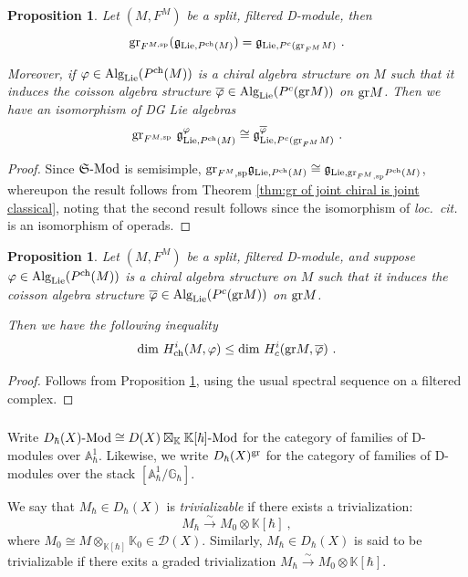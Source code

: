 \documentclass[11pt]{amsart}
\numberwithin{equation}{section}
\newtheorem{prop}[theo]{Proposition}
\theoremstyle{definition}
\newcommand{\bb}{\mathbb}
\newcommand{\mf}{\mathfrak}
\newcommand{\spe}{{\textup{sp}}}
\newcommand{\gd}{{\textup{gr}}}
\newcommand{\D}{{\mathcal{D}}}
\newcommand{\Mod}{{\textup{-Mod}}}
\newcommand{\ik}{{\bb K}}
\newcommand{\Alg}{{\textup{Alg}}}
\newcommand{\Lie}{{\textup{Lie}}}
\newcommand{\ch}{{\textup{ch}}}
\newcommand{\Ss}{{{\mf{S}}}}
\newcommand{\0}{{\textbf{0}}}
\newcommand{\gr}{\textup{gr}}
\def\IA{\mathbb{A}}
\def\IG{\mathbb{G}}
\def\dim{{\rm dim}}
\def\ch{{\rm ch}}
\def\gf{\mathfrak{g}}
\def \mf{\mathfrak}
\begin{document}
\begin{prop}\label{prop:filt on Lie alg}
	Let $(M, F^M)$ be a split, filtered D-module, then 
	\[
	\gr_{F^{M,\spe}}(\gf_{\Lie,P^\ch(M)}) = \gf_{\Lie, P^c(\gr_{F^M} M)}~.
	\]

	Moreover, if $\varphi\in \Alg_\Lie(P^\ch(M))$ is a chiral algebra structure on $M$ such that it induces the coisson algebra structure $\overline \varphi \in \Alg_{\Lie}(P^c(\gr M))$ on $\gr M$. Then we have an isomorphism of DG Lie algebras
	\[
	\gr_{F^{M,\spe}}\ \gf^\varphi_{\Lie,P^\ch(M)} \cong \gf^{\overline{\varphi}}_{\Lie,P^c(\gr_{F^M} M)}~.
	\]
\end{prop}
\begin{proof}
Since $\Ss\Mod$ is semisimple, $\gr_{F^M,\spe}\gf_{\Lie,P^\ch(M)} \cong \gf_{\Lie, \gr_{F^M, \spe} P^\ch(M)}$, whereupon the result follows from Theorem \ref{thm:gr of joint chiral is joint classical}, noting that the second result follows since the isomorphism of \textit{loc.\ cit.} is an isomorphism of operads.
\end{proof}


\begin{prop}\label{prop:bound on cohomology}
Let $(M, F^M)$ be a split, filtered D-module, and suppose $\varphi\in \Alg_\Lie(P^\ch(M))$ is a chiral algebra structure on $M$ such that it induces the coisson algebra structure $\overline \varphi \in \Alg_{\Lie}(P^c(\gr M))$ on $\gr M$.

Then we have the following inequality
\[
\dim\ H^i_\ch(M,\varphi) \le \dim\ H^i_c(\gr M, \overline \varphi)~.
\]
\end{prop}
\begin{proof}
Follows from Proposition \ref{prop:filt on Lie alg}, using the usual spectral sequence on a filtered complex.
\end{proof}



\subsubsection{}

Write $D_\hbar(X)\Mod\cong D(X)\boxtimes_\ik \ik[\hbar]\Mod$ for the category of families of D-modules over $\IA^1_\hbar$. Likewise, we write $D_\hbar(X)^\gd$ for the category of families of D-modules over the stack $[\IA^1_\hbar/\IG_\hbar]$.

We say that $M_\hbar\in D_\hbar(X)$ is \emph{trivializable} if there exists a trivialization:
\[
M_\hbar \xrightarrow{\sim} M_0 \otimes \ik[\hbar]~,
\]
where $M_0 \cong M\otimes_{\ik[\hbar]}\ik_0\in\D(X)$. Similarly, $M_\hbar\in D_\hbar(X)$ is said to be trivializable if there exits a graded trivialization $M_\hbar \xrightarrow{\sim} M_0 \otimes \ik[\hbar]$.
\end{document}
